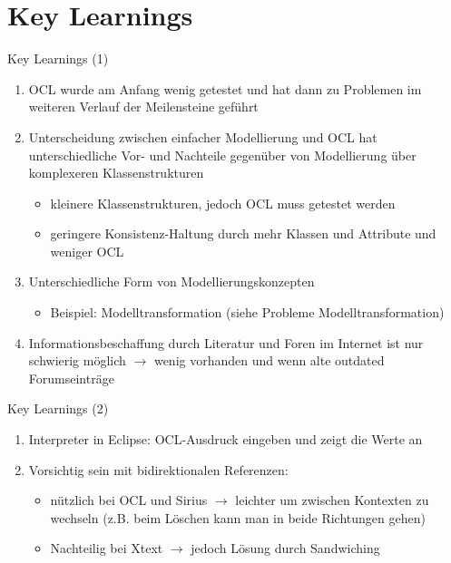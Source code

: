 \section{Key Learnings}
\begin{frame}{Key Learnings (1)}
	\begin{enumerate}
		\item OCL wurde am Anfang wenig getestet und hat dann zu Problemen im weiteren Verlauf der Meilensteine geführt
		\item Unterscheidung zwischen einfacher Modellierung und OCL hat unterschiedliche Vor- und Nachteile gegenüber von Modellierung über komplexeren Klassenstrukturen
		\begin{itemize}
			\item kleinere Klassenstrukturen, jedoch OCL muss getestet werden
			\item geringere Konsistenz-Haltung durch mehr Klassen und Attribute und weniger OCL
		\end{itemize}
		\item Unterschiedliche Form von Modellierungskonzepten
		\begin{itemize}
			\item Beispiel: Modelltransformation (siehe Probleme Modelltransformation)
		\end{itemize}
		\item Informationsbeschaffung durch Literatur und Foren im Internet ist nur schwierig möglich $\rightarrow$ wenig vorhanden und wenn alte outdated Forumseinträge
	\end{enumerate}
\end{frame}

\begin{frame}{Key Learnings (2)}
	\begin{enumerate}
		\item Interpreter in Eclipse: OCL-Ausdruck eingeben und zeigt die Werte an
		\item Vorsichtig sein mit bidirektionalen Referenzen:
		\begin{itemize}
			\item nützlich bei OCL und Sirius $\rightarrow$ leichter um zwischen Kontexten zu wechseln (z.B. beim Löschen kann man in beide Richtungen gehen)
			\item Nachteilig bei Xtext $\rightarrow$ jedoch Lösung durch Sandwiching
		\end{itemize}
	\end{enumerate}
\end{frame}